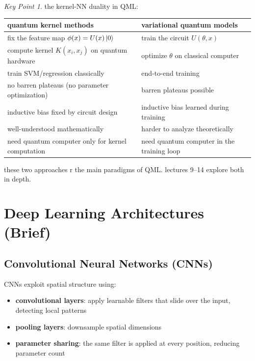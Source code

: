 \documentclass[11pt,a4paper]{article}
\theoremstyle{definition}
\theoremstyle{remark}
\newtheorem*{keypoint}{Key Point}
\begin{document}
\begin{keypoint}
the kernel-NN duality in QML:
\begin{center}
\begin{tabular}{l|l}
\textbf{quantum kernel methods} & \textbf{variational quantum models} \\
\hline
fix the feature map $\phi(x) = U(x)\ket{0}$ & train the circuit $U(\theta, x)$ \\
compute kernel $K(x_i, x_j)$ on quantum hardware & optimize $\theta$ on classical computer \\
train SVM/regression classically & end-to-end training \\
no barren plateaus (no parameter optimization) & barren plateaus possible \\
inductive bias fixed by circuit design & inductive bias learned during training \\
well-understood mathematically & harder to analyze theoretically \\
need quantum computer only for kernel computation & need quantum computer in the training loop
\end{tabular}
\end{center}
these two approaches r the main paradigms of QML. lectures 9--14 explore both in depth.
\end{keypoint}

\section{Deep Learning Architectures (Brief)}

\subsection{Convolutional Neural Networks (CNNs)}

CNNs exploit spatial structure using:
\begin{itemize}
    \item \textbf{convolutional layers}: apply learnable filters that slide over the input, detecting local patterns
    \item \textbf{pooling layers}: downsample spatial dimensions
    \item \textbf{parameter sharing}: the same filter is applied at every position, reducing parameter count
\end{itemize}
\end{document}
